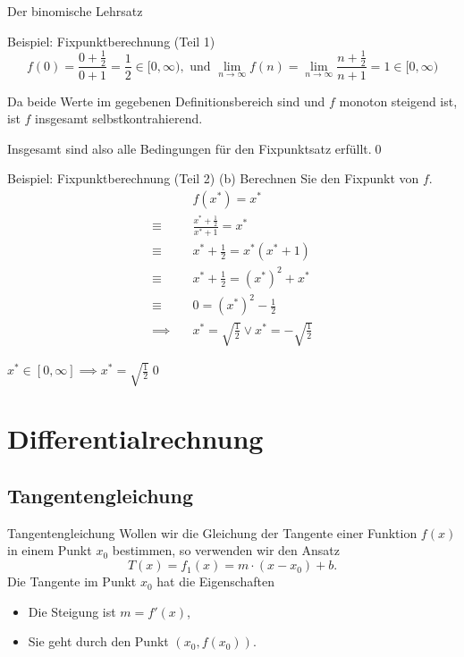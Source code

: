 \documentclass[german]{spicker}
\begin{document}
\begin{defi}{Der binomische Lehrsatz}
\begin{bonus}{Beispiel: Fixpunktberechnung (Teil 1)}
    $$f(0) = \frac{0+\frac{1}{2}}{0+1} = \frac{1}{2}\in [0,\infty), \text{ und } \lim_{n\to\infty} f(n) = \lim_{n\to\infty} \frac{n+\frac{1}{2}}{n+1} = 1\in [0,\infty)$$

    Da beide Werte im gegebenen Definitionsbereich sind und $f$ monoton steigend ist, ist $f$ insgesamt selbstkontrahierend.

    Insgesamt sind also alle Bedingungen für den Fixpunktsatz erfüllt.\qed

\end{bonus}

\begin{bonus}{Beispiel: Fixpunktberechnung (Teil 2)}
    (b) Berechnen Sie den Fixpunkt von $f$.
    $$
        \begin{aligned}
                           & f(x^*) = x^*                                            \\
            \equiv \quad   & \frac{x^*+\frac{1}{2}}{x^*+1} = x^*                     \\
            \equiv \quad   & x^*+\frac{1}{2} = x^*(x^*+1)                            \\
            \equiv \quad   & x^*+\frac{1}{2} = (x^*)^2+x^*                           \\
            \equiv \quad   & 0 = (x^*)^2-\frac{1}{2}                                 \\
            \implies \quad & x^* = \sqrt{\frac{1}{2}} \lor x^* = -\sqrt{\frac{1}{2}}
        \end{aligned}
    $$

    $x^* \in [0,\infty] \implies x^* = \sqrt{\frac{1}{2}}$\qed
\end{bonus}

\section{Differentialrechnung}
\subsection{Tangentengleichung}

\begin{algo}{Tangentengleichung}
    Wollen wir die Gleichung der Tangente einer Funktion $f(x)$ in einem Punkt $x_0$ bestimmen, so verwenden wir den Ansatz
    $$
        T(x) = f_1(x) = m \cdot (x-x_0) + b.
    $$
    Die Tangente im Punkt $x_0$ hat die Eigenschaften
    \begin{itemize}
        \item Die Steigung ist $m = f'(x)$,
        \item Sie geht durch den Punkt $(x_0, f(x_0))$.
    \end{itemize}


\end{algo}
\end{defi}
\end{document}
